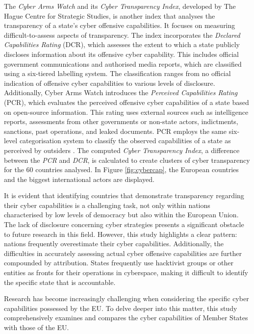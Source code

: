 The \textit{Cyber Arms Watch} and its \textit{Cyber Transparency Index}, developed by The Hague Centre for Strategic Studies, is another index that analyses the transparency of a state's cyber offensive capabilities. It focuses on measuring difficult-to-assess aspects of transparency. The index incorporates the \textit{Declared Capabilities Rating} (DCR), which assesses the extent to which a state publicly discloses information about its offensive cyber capability. This includes official government communications and authorised media reports, which are classified using a six-tiered labelling system. The classification ranges from no official indication of offensive cyber capabilities to various levels of disclosure. Additionally, Cyber Arms Watch introduces the \textit{Perceived Capabilities Rating} (PCR), which evaluates the perceived offensive cyber capabilities of a state based on open-source information. This rating uses external sources such as intelligence reports, assessments from other governments or non-state actors, indictments, sanctions, past operations, and leaked documents. PCR employs the same six-level categorisation system to classify the observed capabilities of a state as perceived by outsiders \autocite[4]{faesen_2022_cyber}. The computed \textit{Cyber Transparency Index}, a difference between the \textit{PCR} and \textit{DCR}, is calculated to create clusters of cyber transparency for the 60 countries analysed. In Figure \ref{fig:cybercap}, the European countries and the biggest international actors are displayed. 

It is evident that identifying countries that demonstrate transparency regarding their cyber capabilities is a challenging task, not only within nations characterised by low levels of democracy but also within the European Union. The lack of disclosure concerning cyber strategies presents a significant obstacle to future research in this field. However, this study highlights a clear pattern: nations frequently overestimate their cyber capabilities. Additionally, the difficulties in accurately assessing actual cyber offensive capabilities are further compounded by attribution. States frequently use hacktivist groups or other entities as fronts for their operations in cyberspace, making it difficult to identify the specific state that is accountable.

Research has become increasingly challenging when considering the specific cyber capabilities possessed by the EU. To delve deeper into this matter, this study comprehensively examines and compares the cyber capabilities of Member States with those of the EU.

